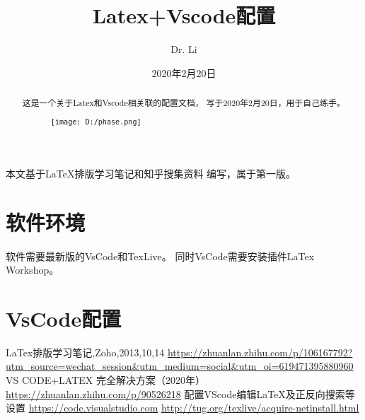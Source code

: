 \documentclass[10pt, UTF8]{ctexart}%
\begin{document}
    
    \title{Latex+Vscode配置}
    \author{Dr. Li}
    \date{2020年2月20日}
    \maketitle

    \begin{abstract}
        这是一个关于Latex和Vscode相关联的配置文档，
        写于2020年2月20日，用于自己练手。
        \begin{figure}[htbp]%
            \centering
            \texttt{[image: D:/phase.png]}
        \end{figure} 
    \end{abstract}

   本文基于\LaTeX 排版学习笔记\cite{LaTex排版学习笔记}和知乎搜集资料
   \cite{知乎Ref1,知乎Ref2}编写，属于第一版。

    \section{软件环境}
    软件需要最新版的VsCode\cite{Vscode网址}和TexLive\cite{TexLive网址}。
    同时VsCode需要安装插件LaTex Workshop。
    \section{VsCode配置}
    


    
    \begin{thebibliography}{123456}%
         LaTex排版学习笔记,Zoho,2013,10,14
         \url{https://zhuanlan.zhihu.com/p/106167792?utm_source=wechat_session&utm_medium=social&utm_oi=619471395880960}
        VS CODE+LATEX 完全解决方案（2020年）
         \url{https://zhuanlan.zhihu.com/p/90526218}
        配置VScode编辑LaTeX及正反向搜索等设置
          \url{https://code.visualstudio.com}
         \url{http://tug.org/texlive/acquire-netinstall.html}
    \end{thebibliography}
\end{document}
